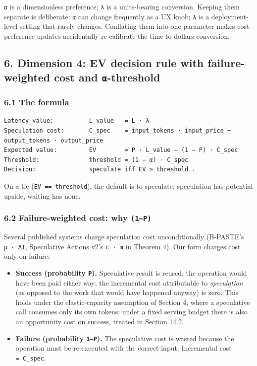 \documentclass[
  11pt,
]{article}
\newcounter{none} %
\providecommand{\tightlist}{%
  \setlength{\itemsep}{0pt}\setlength{\parskip}{0pt}}
\begin{document}
\texttt{α} is a dimensionless preference; \texttt{λ} is a units-bearing
conversion. Keeping them separate is deliberate: \texttt{α} can change
frequently as a UX knob; \texttt{λ} is a deployment-level setting that
rarely changes. Conflating them into one parameter makes cost-preference
updates accidentally re-calibrate the time-to-dollars conversion.

\subsection{\texorpdfstring{6. Dimension 4: EV decision rule with
failure-weighted cost and
\texttt{α}-threshold}{6. Dimension 4: EV decision rule with failure-weighted cost and α-threshold}}\label{dimension-4-ev-decision-rule-with-failure-weighted-cost-and-ux3b1-threshold}

\subsubsection{6.1 The formula}\label{the-formula}

\begin{verbatim}
Latency value:          L_value   = L · λ
Speculation cost:       C_spec    = input_tokens · input_price + output_tokens · output_price
Expected value:         EV        = P · L_value − (1 − P) · C_spec
Threshold:              threshold = (1 − α) · C_spec
Decision:               speculate iff EV ≥ threshold .
\end{verbatim}

On a tie (\texttt{EV\ ==\ threshold}), the default is to speculate:
speculation has potential upside, waiting has none.

\subsubsection{\texorpdfstring{6.2 Failure-weighted cost: why
\texttt{(1−P)}}{6.2 Failure-weighted cost: why (1−P)}}\label{failure-weighted-cost-why-1p}

Several published systems charge speculation cost unconditionally
(B-PASTE's \texttt{µ\ ·\ ΔI}, Speculative Actions v2's \texttt{c\ ·\ m}
in Theorem 4). Our form charges cost only on failure:

\begin{itemize}
\tightlist
\item
  \textbf{Success (probability \texttt{P}).} Speculative result is
  reused; the operation would have been paid either way; the incremental
  cost attributable to \emph{speculation} (as opposed to the work that
  would have happened anyway) is zero. This holds under the
  elastic-capacity assumption of Section 4, where a speculative call
  consumes only its own tokens; under a fixed serving budget there is
  also an opportunity cost on success, treated in Section 14.2.
\item
  \textbf{Failure (probability \texttt{1−P}).} The speculative cost is
  wasted because the operation must be re-executed with the correct
  input. Incremental cost \texttt{=\ C\_spec}.
\end{itemize}
\end{document}
